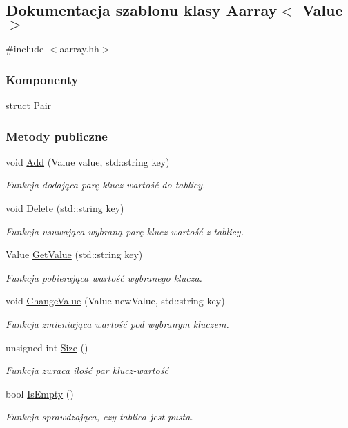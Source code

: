 \hypertarget{class_aarray}{\subsection{Dokumentacja szablonu klasy Aarray$<$ Value $>$}
\label{class_aarray}
}


{\ttfamily \#include $<$aarray.\-hh$>$}

\subsubsection*{Komponenty}
\begin{DoxyCompactItemize}
\item 
struct \hyperlink{struct_aarray_1_1_pair}{Pair}
\end{DoxyCompactItemize}
\subsubsection*{Metody publiczne}
\begin{DoxyCompactItemize}
\item 
void \hyperlink{class_aarray_ab8cea28c7c42aed9126ad8793ff9fbd0}{Add} (Value value, std\-::string key)
\begin{DoxyCompactList}\small\item\em Funkcja dodająca parę klucz-\/wartość do tablicy. \end{DoxyCompactList}\item 
void \hyperlink{class_aarray_a4406f808014ebe6eeb252665d5b073e5}{Delete} (std\-::string key)
\begin{DoxyCompactList}\small\item\em Funkcja usuwająca wybraną parę klucz-\/wartość z tablicy. \end{DoxyCompactList}\item 
Value \hyperlink{class_aarray_a4e5974b11d28d3fe057c603fa11a8d7e}{Get\-Value} (std\-::string key)
\begin{DoxyCompactList}\small\item\em Funkcja pobierająca wartość wybranego klucza. \end{DoxyCompactList}\item 
void \hyperlink{class_aarray_a11c4d5f1839ea9cd8532cfb7fa4d1033}{Change\-Value} (Value new\-Value, std\-::string key)
\begin{DoxyCompactList}\small\item\em Funkcja zmieniająca wartość pod wybranym kluczem. \end{DoxyCompactList}\item 
unsigned int \hyperlink{class_aarray_ab464f407ff70721e4fd5f075ddcf16a9}{Size} ()
\begin{DoxyCompactList}\small\item\em Funkcja zwraca ilość par klucz-\/wartość \end{DoxyCompactList}\item 
bool \hyperlink{class_aarray_ae9ea529b2bbbdba807cf1bd01e896c27}{Is\-Empty} ()
\begin{DoxyCompactList}\small\item\em Funkcja sprawdzająca, czy tablica jest pusta. \end{DoxyCompactList}\end{DoxyCompactItemize}
